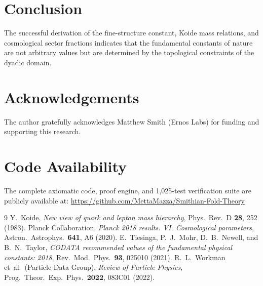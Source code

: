 \documentclass[11pt,a4paper]{article}
\begin{document}
\section{Conclusion}
The successful derivation of the fine-structure constant, Koide mass relations, and cosmological sector fractions indicates that the fundamental constants of nature are not arbitrary values but are determined by the topological constraints of the dyadic domain.

\section*{Acknowledgements}
The author gratefully acknowledges Matthew Smith (Ernos Labs) for funding and supporting this research.

\section*{Code Availability}
The complete axiomatic code, proof engine, and 1,025-test verification suite are publicly available at:
\url{https://github.com/MettaMazza/Smithian-Fold-Theory}

\begin{thebibliography}{9}
 Y.~Koide, \textit{New view of quark and lepton mass hierarchy}, Phys.\ Rev.\ D \textbf{28}, 252 (1983).
 Planck Collaboration, \textit{Planck 2018 results. VI. Cosmological parameters}, Astron.\ Astrophys.\ \textbf{641}, A6 (2020).
 E.~Tiesinga, P.~J.~Mohr, D.~B.~Newell, and B.~N.~Taylor, \textit{CODATA recommended values of the fundamental physical constants: 2018}, Rev.\ Mod.\ Phys.\ \textbf{93}, 025010 (2021).
 R.~L.~Workman et~al.\ (Particle Data Group), \textit{Review of Particle Physics}, Prog.\ Theor.\ Exp.\ Phys.\ \textbf{2022}, 083C01 (2022).
\end{thebibliography}
\end{document}
